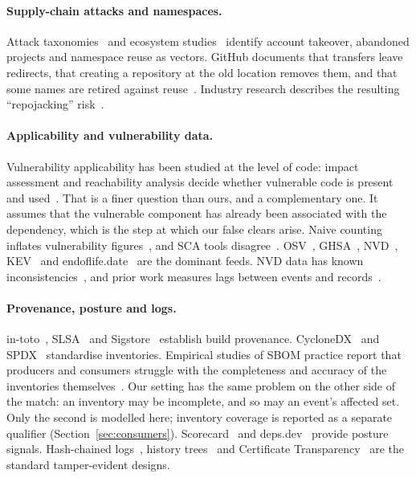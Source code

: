 \documentclass[11pt,a4paper]{article}
\begin{document}
\paragraph{Supply-chain attacks and namespaces.} Attack
taxonomies~\cite{ohm2020backstabber,ladisa2023sok} and ecosystem
studies~\cite{zimmermann2019small,zahan2022weak,gu2023investigating}
identify account takeover, abandoned projects and namespace reuse as
vectors. GitHub documents that transfers leave redirects, that
creating a repository at the old location removes them, and that some
names are retired against reuse~\cite{github2026transfer}. Industry
research describes the resulting ``repojacking''
risk~\cite{goldman2023repojacking}.

\paragraph{Applicability and vulnerability data.} Vulnerability
applicability has been studied at the level of code: impact assessment
and reachability analysis decide whether vulnerable code is present
and used~\cite{plate2015impact,ponta2018beyond,ponta2020detection}.
That is a finer question than ours, and a complementary one. It
assumes that the vulnerable component has already been associated with
the dependency, which is the step at which our false clears arise.
Naive counting inflates vulnerability figures~\cite{pashchenko2018vulnerable},
and SCA tools disagree~\cite{imtiaz2021comparative}. OSV~\cite{osvschema},
GHSA~\cite{ghsa}, NVD~\cite{nistnvd}, KEV~\cite{cisakev} and
endoflife.date~\cite{endoflifedate} are the dominant feeds. NVD data
has known inconsistencies~\cite{anwar2022cleaning}, and prior work
measures lags between events and records~\cite{li2017patches,chinthanet2021lags}.

\paragraph{Provenance, posture and logs.} in-toto~\cite{torresarias2019intoto},
SLSA~\cite{slsa12} and Sigstore~\cite{newman2022sigstore} establish
build provenance. CycloneDX~\cite{ecma424} and SPDX~\cite{spdx}
standardise inventories. Empirical studies of SBOM practice report
that producers and consumers struggle with the completeness and
accuracy of the inventories themselves~\cite{xia2023sbom,stalnaker2024boms}.
Our setting has the same problem on the other side of the match: an
inventory may be incomplete, and so may an event's affected set. Only
the second is modelled here; inventory coverage is reported as a
separate qualifier (Section~\ref{sec:consumers}). Scorecard~\cite{zahan2023scorecard} and
deps.dev~\cite{depsdev} provide posture signals. Hash-chained
logs~\cite{schneier1999audit}, history trees~\cite{crosby2009tamper}
and Certificate Transparency~\cite{rfc6962,rfc9162} are the standard
tamper-evident designs.
\end{document}
